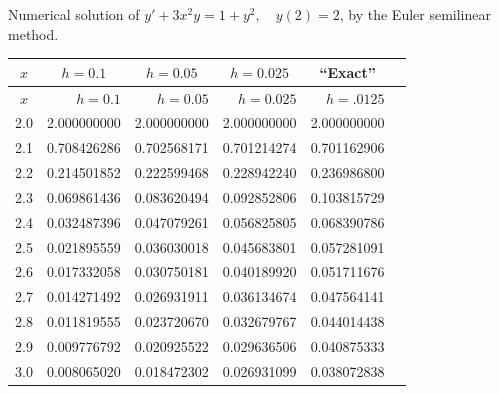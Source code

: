 \begin{examplesolution}
\begin{newtable}
  \label{table:3.1.10} Numerical solution of $y'+3x^{2}y=1+y^{2},\quad y(2)=2$, by the Euler
  semilinear method.
  \begin{center}
    \begin{tabular}{|c|r|r|r|r|r|}
      \hline
      \multicolumn{1}{|c|}{$x$} & \multicolumn{1}{|c|}{$h=0.1$} & \multicolumn{1}{|c|}{$h=0.05$} & \multicolumn{1}{|c|}{$h=0.025$} & \multicolumn{1}{|c|}{``Exact''} \\
      \hline
      $x$                       & $h=0.1$                       & $h=0.05$                       & $h=0.025$                       & $h=.0125$                       \\
      \hline
      2.0                       & 2.000000000                   & 2.000000000                    & 2.000000000                     & 2.000000000                     \\
      2.1                       & 0.708426286                   & 0.702568171                    & 0.701214274                     & 0.701162906                     \\
      2.2                       & 0.214501852                   & 0.222599468                    & 0.228942240                     & 0.236986800                     \\
      2.3                       & 0.069861436                   & 0.083620494                    & 0.092852806                     & 0.103815729                     \\
      2.4                       & 0.032487396                   & 0.047079261                    & 0.056825805                     & 0.068390786                     \\
      2.5                       & 0.021895559                   & 0.036030018                    & 0.045683801                     & 0.057281091                     \\
      2.6                       & 0.017332058                   & 0.030750181                    & 0.040189920                     & 0.051711676                     \\
      2.7                       & 0.014271492                   & 0.026931911                    & 0.036134674                     & 0.047564141                     \\
      2.8                       & 0.011819555                   & 0.023720670                    & 0.032679767                     & 0.044014438                     \\
      2.9                       & 0.009776792                   & 0.020925522                    & 0.029636506                     & 0.040875333                     \\
      3.0                       & 0.008065020                   & 0.018472302                    & 0.026931099                     & 0.038072838                     \\
      \hline
    \end{tabular}
  \end{center}
\end{newtable}
\end{examplesolution}

